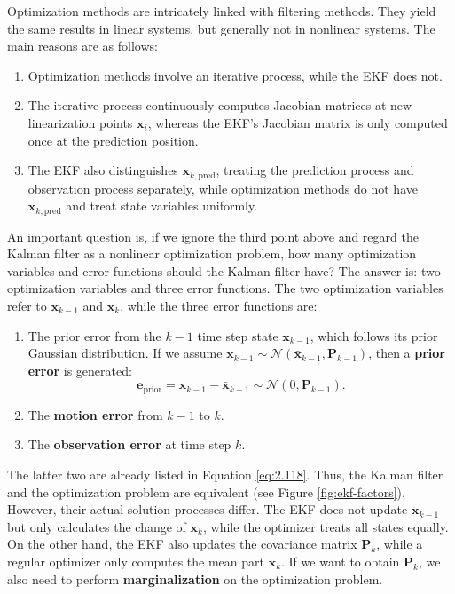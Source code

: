 Optimization methods are intricately linked with filtering methods. They yield the same results in linear systems, but generally not in nonlinear systems. The main reasons are as follows:

\begin{enumerate}
\item Optimization methods involve an iterative process, while the EKF does not.
\item The iterative process continuously computes Jacobian matrices at new linearization points $\mathbf{x}_i$, whereas the EKF's Jacobian matrix is only computed once at the prediction position.
\item The EKF also distinguishes $\mathbf{x}_{k,\mathrm{pred}}$, treating the prediction process and observation process separately, while optimization methods do not have $\mathbf{x}_{k,\mathrm{pred}}$ and treat state variables uniformly.
\end{enumerate}


An important question is, if we ignore the third point above and regard the Kalman filter as a nonlinear optimization problem, how many optimization variables and error functions should the Kalman filter have? The answer is: two optimization variables and three error functions. The two optimization variables refer to $\mathbf{x}_{k-1}$ and $\mathbf{x}_{k}$, while the three error functions are:

\begin{enumerate}
\item The prior error from the $k-1$ time step state $\mathbf{x}_{k-1}$, which follows its prior Gaussian distribution. If we assume $\mathbf{x}_{k-1} \sim \mathcal{N}(\bar{\mathbf{x}}_{k-1}, \mathbf{P}_{k-1})$, then a \textbf{prior error} is generated:
\begin{equation}
	\mathbf{e}_{\text{prior}} = \mathbf{x}_{k-1} - \bar{\mathbf{x}}_{k-1} \sim \mathcal{N}(0, \mathbf{P}_{k-1}).
\end{equation}

\item The \textbf{motion error} from $k-1$ to $k$.
\item The \textbf{observation error} at time step $k$.
\end{enumerate}

The latter two are already listed in Equation \eqref{eq:2.118}. Thus, the Kalman filter and the optimization problem are equivalent (see Figure \ref{fig:ekf-factors}). However, their actual solution processes differ. The EKF does not update $\mathbf{x}_{k-1}$ but only calculates the change of $\mathbf{x}_k$, while the optimizer treats all states equally. On the other hand, the EKF also updates the covariance matrix $\mathbf{P}_{k}$, while a regular optimizer only computes the mean part $\mathbf{x}_{k}$. If we want to obtain $\mathbf{P}_{k}$, we also need to perform \textbf{marginalization} on the optimization problem.

